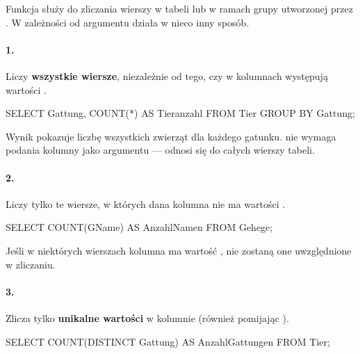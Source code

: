     \begin{tcolorbox}[red={Hinweis}]

        Funkcja  służy do zliczania wierszy w tabeli lub w ramach grupy utworzonej przez .  
        W zależności od argumentu działa w nieco inny sposób.

        \paragraph{1. }
        Liczy \textbf{wszystkie wiersze}, niezależnie od tego, czy w kolumnach występują wartości .

        \begin{sql}
        SELECT Gattung, COUNT(*) AS Tieranzahl
            FROM Tier
            GROUP BY Gattung;
        \end{sql}

        \noindent
        Wynik pokazuje liczbę wszystkich zwierząt dla każdego gatunku.  nie wymaga podania kolumny jako argumentu — odnosi się do całych wierszy tabeli.

        \vspace{0.5em}

        \paragraph{2. }
        Liczy tylko te wiersze, w których dana kolumna nie ma wartości .

        \begin{sql}
        SELECT COUNT(GName) AS AnzahlNamen
            FROM Gehege;
        \end{sql}

        \noindent
        Jeśli w niektórych wierszach kolumna  ma wartość , nie zostaną one uwzględnione w zliczaniu.

        \vspace{0.5em}

        \paragraph{3. }
        Zlicza tylko \textbf{unikalne wartości} w kolumnie (również pomijając ).

        \begin{sql}
        SELECT COUNT(DISTINCT Gattung) AS AnzahlGattungen
            FROM Tier;
        \end{sql}


\end{tcolorbox}
